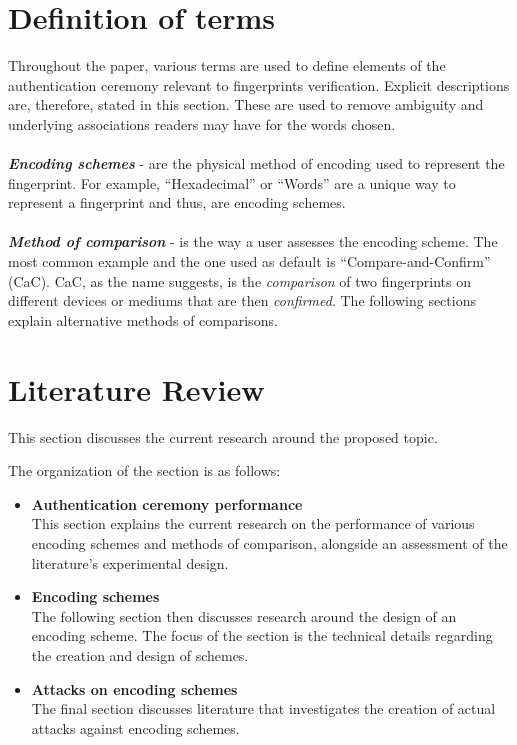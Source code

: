 \section{Definition of terms}
Throughout the paper, various terms are used to define elements of the authentication ceremony relevant to fingerprints verification. Explicit descriptions are, therefore, stated in this section. These are used to remove ambiguity and underlying associations readers may have for the words chosen.
\\\\
\textbf{\textit{Encoding schemes}} - are the physical method of encoding used to represent the fingerprint. For example, ``Hexadecimal'' or ``Words'' are a unique way to represent a fingerprint and thus, are encoding schemes.
\\\\
\textbf{\textit{Method of comparison}} - is the way a user assesses the encoding scheme. The most common example and the one used as default is ``Compare-and-Confirm'' (CaC). CaC, as the name suggests, is the \textit{comparison} of two fingerprints on different devices or mediums that are then \textit{confirmed}. The following sections explain alternative methods of comparisons.


\section{Literature Review}
This section discusses the current research around the proposed topic.

The organization of the section is as follows:

\begin{itemize}
    \item \textbf{Authentication ceremony performance} \\
    This section explains the current research on the performance of various encoding schemes and methods of comparison, alongside an assessment of the literature's experimental design.

    \item \textbf{Encoding schemes} \\
    The following section then discusses research around the design of an encoding scheme. The focus of the section is the technical details regarding the creation and design of schemes. 

    \item \textbf{Attacks on encoding schemes} \\
    The final section discusses literature that investigates the creation of actual attacks against encoding schemes.
\end{itemize}

